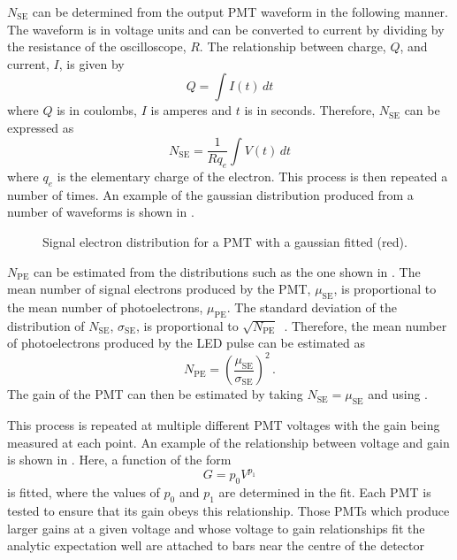 $N_{\text{SE}}$ can be determined from the output PMT waveform in the following manner.
The waveform is in voltage units and can be converted to current by dividing by the resistance of the oscilloscope, $R$.
The relationship between charge, $Q$, and current, $I$, is given by
\begin{equation}
  Q = \int I(t) \, dt
\end{equation}
where $Q$ is in coulombs, $I$ is amperes and $t$ is in seconds.
Therefore, $N_{\text{SE}}$ can be expressed as
\begin{equation}
  N_{\text{SE}} = \frac{1}{R q_{e}} \int V(t) \, dt
\end{equation}
where $q_{e}$ is the elementary charge of the electron.
This process is then repeated a number of times.
An example of the gaussian distribution produced from a number of waveforms is shown in .

\begin{figure}[h]
  \begin{adjustbox}{max totalsize={.8\textwidth}, center}
    
  \end{adjustbox}
  \caption[Signal electron distribution for a PMT]{Signal electron distribution for a PMT with a gaussian fitted (red).}
  \label{fig:N_se}
\end{figure}

$N_{\text{PE}}$ can be estimated from the distributions such as the one shown in .
The mean number of signal electrons produced by the PMT, $\mu_{\text{SE}}$, is proportional to the mean number of photoelectrons, $\mu_{\text{PE}}$.
The standard deviation of the distribution of $N_{\text{SE}}$, $\sigma_{\text{SE}}$, is proportional to $\sqrt{N_{\text{PE}}}$~\cite{photoelectrons}.
Therefore, the mean number of photoelectrons produced by the LED pulse can be estimated as
\begin{equation}
  N_{\text{PE}} = \left( \frac{ \mu_{\text{SE}} }{ \sigma_{\text{SE}} }  \right)^{2} \, .
\end{equation}
The gain of the PMT can then be estimated by taking $N_{\text{SE}} = \mu_{\text{SE}}$ and using .

This process is repeated at multiple different PMT voltages with the gain being measured at each point.
An example of the relationship between voltage and gain is shown in .
Here, a function of the form
\begin{equation}
  G = p_{0} V^{p_{1}}
  \label{eq:gain}
\end{equation}
is fitted, where the values of $p_{0}$ and $p_{1}$ are determined in the fit.
Each PMT is tested to ensure that its gain obeys this relationship.
Those PMTs which produce larger gains at a given voltage and whose voltage to gain relationships fit the analytic expectation well are attached to bars near the centre of the detector

